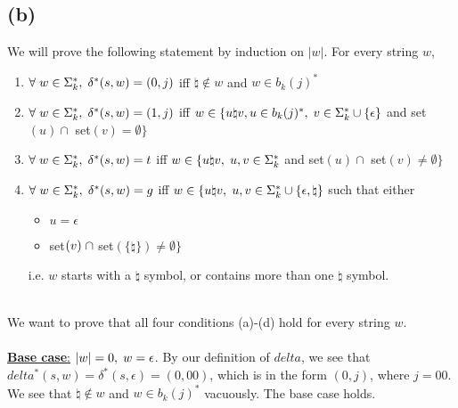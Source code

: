 \documentclass[11pt]{article}
\begin{document}
\subsection*{(b)}
We will prove the following statement by induction on $|w|$. For every string $w$,
\begin{enumerate}[label=\textbf{(\alph*)}]
	\item $\forall\hspace{1mm}w\in\Sigma_k^*,\hspace{1mm}\delta^*(s,w)=(0,j)$ iff $\natural\notin w$ and $w\in b_k(j)^*$
	\item $\forall\hspace{1mm}w\in\Sigma_k^*,\hspace{1mm}\delta^*(s,w)=(1,j)$ iff $w\in\{u\natural v,u\in b_k(j)^*,\hspace{1mm}v\in\Sigma_k^*\cup\{\epsilon\}$ and set$(u)\cap$ set$(v)=\emptyset\}$
	\item $\forall\hspace{1mm}w\in\Sigma_k^*,\hspace{1mm}\delta^*(s,w)=t$ iff $w\in\{u\natural v,\hspace{1mm}u,v\in\Sigma_k^*$ and set$(u)\cap$ set$(v)\neq\emptyset\}$
	\item $\forall\hspace{1mm}w\in\Sigma_k^*,\hspace{1mm}\delta^*(s,w)=g$ iff $w\in\{u\natural v,\hspace{1mm}u,v\in\Sigma_k^*\cup\{\epsilon,\natural\}$ such that either
	\begin{itemize}
		\item $u=\epsilon$
		\item set$(v)\hspace{1mm}\cap$ set$(\{\natural\})\neq\emptyset\}$
	\end{itemize}
	i.e. $w$ starts with a $\natural$ symbol, or contains more than one $\natural$ symbol.
\end{enumerate}
\ \\
We want to prove that all four conditions (a)-(d) hold for every string $w$. \\ \\
\underline{\textbf{Base case}:} $|w|=0,\hspace{1mm}w=\epsilon$. By our definition of $delta$, we see that $delta^*(s,w)=\delta^*(s,\epsilon)=(0,00)$, which is in the form $(0,j)$, where $j=00$. We see that $\natural\notin w$ and $w\in b_k(j)^*$ vacuously. The base case holds. \\ \\
\end{document}
